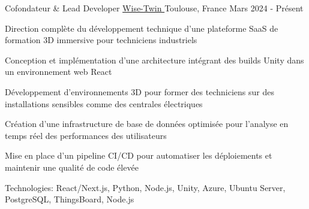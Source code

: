 


\begin{cventries}


\cventry
{Cofondateur \& Lead Developer} %
{\href{https://www.wisetwin.eu}{Wise-Twin {\tiny\textcolor{black}{\faExternalLink}}}} %
{Toulouse, France} %
{Mars 2024 - Présent} %
{ %
\begin{cvitems}
\item {Direction complète du développement technique d'une plateforme SaaS de formation 3D immersive pour techniciens industriels}
\item {Conception et implémentation d'une architecture intégrant des builds Unity dans un environnement web React}
\item {Développement d'environnements 3D pour former des techniciens sur des installations sensibles comme des centrales électriques}
\item {Création d'une infrastructure de base de données optimisée pour l'analyse en temps réel des performances des utilisateurs}
\item {Mise en place d'un pipeline CI/CD pour automatiser les déploiements et maintenir une qualité de code élevée}
\item {Technologies: React/Next.js, Python, Node.js, Unity, Azure, Ubuntu Server, PostgreSQL, ThingsBoard, Node.js}
\end{cvitems}
}

\vspace{1.5em}



\end{cventries}
